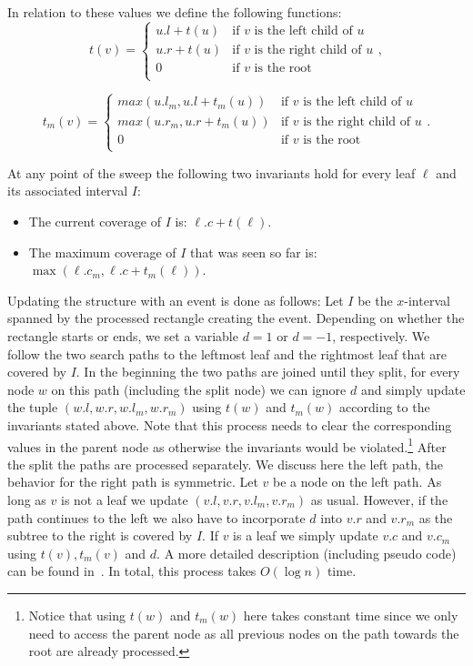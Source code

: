 {{\noindent
In relation to these values we define the following functions:
\[
 t(v) =  \left\{ \begin{array}{ll}
        u.l + t(u) & \mbox{if $v$ is the left child of $u$} \\
        u.r + t(u) & \mbox{if $v$ is the right child of $u$} \\
        0 & \mbox{if $v$ is the root} \\
        \end{array} \right.
,
\]

\[
 t_m(v) =  \left\{ \begin{array}{ll}
        max(u.l_m, u.l + t_m(u)) & \mbox{if $v$ is the left child of $u$} \\
        max(u.r_m, u.r + t_m(u)) & \mbox{if $v$ is the right child of $u$} \\
        0 & \mbox{if $v$ is the root} \\
        \end{array} \right.
 .
\]

\noindent
At any point of the sweep the following two invariants hold for every leaf $\ell$
and its associated interval $I$:
\begin{itemize}
    \item
    The current coverage of $I$ is: $\ell.c + t(\ell)$.
    \item
    The maximum coverage of $I$ that was seen so far is: $\max(\ell.c_m, \ell.c + t_m(\ell))$.
\end{itemize}

\noindent
Updating the structure with an event is done as follows:
Let $I$ be the $x$-interval spanned by the processed rectangle creating the event.
Depending on whether the rectangle starts or ends,
we set a variable $d=1$ or $d=-1$, respectively.
We follow the two search paths to the leftmost leaf and the rightmost leaf that are covered by $I$.
In the beginning the two paths are joined until they split, for every node $w$ on this path
(including the split node) we can ignore $d$ and simply
update the tuple $(w.l,w.r,w.l_m,w.r_m)$ using $t(w)$ and $t_m(w)$
according to the invariants stated above. Note that this process needs to clear the
corresponding values in the parent node as otherwise the invariants would be violated.\footnote{Notice that using $t(w)$ and $t_m(w)$ here
takes constant time since we only need to access the parent
node as all previous nodes on the path towards the root are already processed.}
After the split the paths are processed separately.
We discuss here the left path, the behavior for the right path is symmetric.
Let $v$ be a node on the left path.
As long as $v$ is not a leaf we update $(v.l,v.r,v.l_m,v.r_m)$ as usual.
However, if the path continues to the left we also have to incorporate $d$ into
$v.r$ and $v.r_m$ as the subtree to the right is covered by $I$.
If $v$ is a leaf we simply update $v.c$ and $v.c_m$ using $t(v), t_m(v)$ and $d$.
A more detailed description (including pseudo code) can be found in~\cite{as-cdaaa-13}.
In total, this process takes $O(\log n)$ time.

}}
